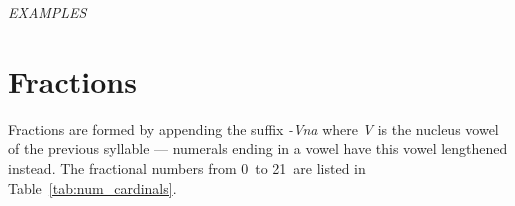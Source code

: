 \documentclass[grammar]{subfiles}
\begin{document}
  \begin{exe}
    \ex \emph{EXAMPLES}
  \end{exe}

  \section{Fractions}
  \label{sec:num_fractions}

  Fractions are formed by appending the suffix \textit{-Vna} where \textit{V} is the nucleus vowel of the previous syllable — numerals ending in a vowel have this vowel lengthened instead. The fractional numbers from 0\dec\ to 21\dec\ are listed in Table~\ref{tab:num_cardinals}.

  \begin{table}[htpb]\small\capstart
    \begin{center}
      \qquad
      \caption{Fractional numerals from 0\dec\ to 21\dec\label{tab:num_fractional}}
    \end{center}
  \end{table}
\end{document}
